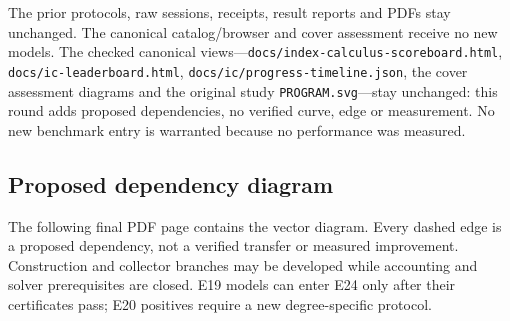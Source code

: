 \documentclass[
  10pt,
]{article}
\begin{document}
The prior protocols, raw sessions, receipts, result reports and PDFs
stay unchanged. The canonical catalog/browser and cover assessment
receive no new models. The checked canonical
views---\texttt{docs/index-calculus-scoreboard.html},
\texttt{docs/ic-leaderboard.html},
\texttt{docs/ic/progress-timeline.json}, the cover assessment diagrams
and the original study \texttt{PROGRAM.svg}---stay unchanged: this round
adds proposed dependencies, no verified curve, edge or measurement. No
new benchmark entry is warranted because no performance was measured.

\subsection{Proposed dependency
diagram}\label{proposed-dependency-diagram}

The following final PDF page contains the vector diagram. Every dashed
edge is a proposed dependency, not a verified transfer or measured
improvement. Construction and collector branches may be developed while
accounting and solver prerequisites are closed. E19 models can enter E24
only after their certificates pass; E20 positives require a new
degree-specific protocol.
\end{document}
